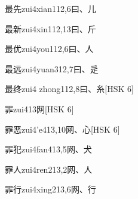 \begin{EntryWithPhonetic}{最先}{zui4xian1}{12,6}{⽈、⼉}
\end{EntryWithPhonetic}

\begin{EntryWithPhonetic}{最新}{zui4xin1}{12,13}{⽈、⽄}
\end{EntryWithPhonetic}

\begin{EntryWithPhonetic}{最优}{zui4you1}{12,6}{⽈、⼈}
\end{EntryWithPhonetic}

\begin{EntryWithPhonetic}{最远}{zui4yuan3}{12,7}{⽈、⾡}
\end{EntryWithPhonetic}

\begin{EntryWithPhonetic}{最终}{zui4 zhong1}{12,8}{⽈、⽷}[HSK 6]
\end{EntryWithPhonetic}

\begin{EntryWithPhonetic}{罪}{zui4}{13}{⽹}[HSK 6]
\end{EntryWithPhonetic}

\begin{EntryWithPhonetic}{罪恶}{zui4'e4}{13,10}{⽹、⼼}[HSK 6]
\end{EntryWithPhonetic}

\begin{EntryWithPhonetic}{罪犯}{zui4fan4}{13,5}{⽹、⽝}
\end{EntryWithPhonetic}

\begin{EntryWithPhonetic}{罪人}{zui4ren2}{13,2}{⽹、⼈}
\end{EntryWithPhonetic}

\begin{EntryWithPhonetic}{罪行}{zui4xing2}{13,6}{⽹、⾏}
\end{EntryWithPhonetic}

